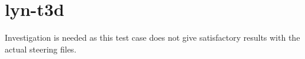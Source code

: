 \chapter{lyn-t3d}

Investigation is needed as this test case does not give satisfactory results with the actual steering files.
